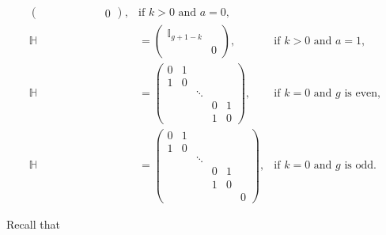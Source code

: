 \begin{definition}
\begin{align}
\begin{pmatrix}
        &   &        &   &   &   &        & 0
      \end{pmatrix}, & \text{if $k>0$ and $a=0$}, \\
    \mathbb{H} &= \begin{pmatrix}
      \mathbb{I}_{g+1-k} & \\
      & 0
    \end{pmatrix},  & \text{if $k>0$ and $a=1$}, \\
    \mathbb{H} &= \begin{pmatrix}
      0 & 1 &        &   &   \\
      1 & 0 &        &   &   \\
        &   & \ddots &   &   \\
        &   &        & 0 & 1 \\
        &   &        & 1 & 0
      \end{pmatrix}, & \text{if $k=0$ and $g$ is even}, \\
    \mathbb{H} &= \begin{pmatrix}
      0 & 1 &        &   &   &   \\
      1 & 0 &        &   &   &   \\
        &   & \ddots &   &   &   \\
        &   &        & 0 & 1 &   \\
        &   &        & 1 & 0 &   \\
        &   &        &   &   & 0
    \end{pmatrix}, & \text{if $k=0$ and $g$ is odd}.
  \end{align}
\end{definition}

Recall that 

